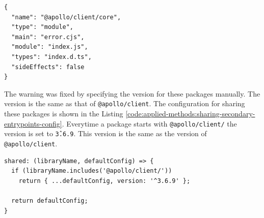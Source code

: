 \ifshowListings
\begin{listing}[H]
  \begin{verbatim}
{
  "name": "@apollo/client/core",
  "type": "module",
  "main": "error.cjs",
  "module": "index.js",
  "types": "index.d.ts",
  "sideEffects": false
}
  \end{verbatim}
  \caption{The content of \texttt{package.json} from \texttt{@apollo/client/core}.}\label{code:applied-methods:package-json-apollo-client-core}
\end{listing}
\fi

\noindent The warning was fixed by specifying the version for these packages manually. The version is the same as that of \texttt{@apollo/client}. The configuration for sharing these packages is shown in the Listing \ref{code:applied-methods:sharing-secondary-entrypoints-config}. Everytime a package starts with \texttt{@apollo/client/} the version is set to \texttt{\^3.6.9}. This version is the same as the version of \texttt{@apollo/client}.

\ifshowListings
\begin{listing}[H]
  \begin{verbatim}
shared: (libraryName, defaultConfig) => {
  if (libraryName.includes('@apollo/client/'))
    return { ...defaultConfig, version: '^3.6.9' };

  return defaultConfig;
}
  \end{verbatim}
  \caption{Specify the version for the secondary entry points for the \texttt{@apollo/client} package.}\label{code:applied-methods:sharing-secondary-entrypoints-config}
\end{listing}
\fi
